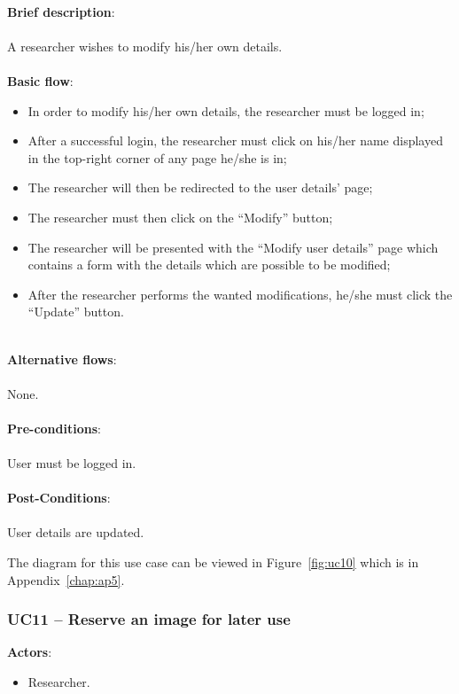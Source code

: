 \ \\
\textbf{Brief description}:\\
\ \\
A researcher wishes to modify his/her own details.\\
\ \\
\textbf{Basic flow}:

\begin{itemize}
\item In order to modify his/her own details, the researcher must be logged in;
\item After a successful login, the researcher must click on his/her name displayed in the top-right corner of any page he/she is in;
\item The researcher will then be redirected to the user details' page;
\item The researcher must then click on the ``Modify'' button;
\item The researcher will be presented with the ``Modify user details'' page which contains a form with the details which are possible to be modified;
\item After the researcher performs the wanted modifications, he/she must click the ``Update'' button.
\end{itemize}

\ \\
\textbf{Alternative flows}:\\
\ \\
None.\\
\ \\
\textbf{Pre-conditions}:\\
\ \\
User must be logged in.\\
\ \\
\textbf{Post-Conditions}:\\
\ \\
User details are updated.

The diagram for this use case can be viewed in Figure~\ref{fig:uc10} which is in Appendix~\ref{chap:ap5}.

\subsubsection{UC11 -- Reserve an image for later use}\label{uc11}

\textbf{Actors}:

\begin{itemize}
\item Researcher.
\end{itemize}

